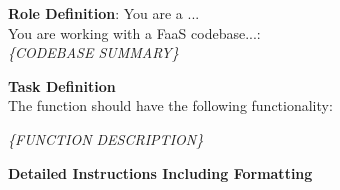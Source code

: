 \begin{tcolorbox}[colback=orange!5!white, colframe=orange!95!white, colbacktitle=orange!95!white, title=Zero Shot with Codebase Summarization]
\small
    \textbf{Role Definition}: You are a ...\\
    You are working with a FaaS codebase...:\\
    \textit{\{CODEBASE SUMMARY\}}

    \tcblower
\small
    \textbf{Task Definition}\\
    The function should have the following functionality:
    
    \textit{\{FUNCTION DESCRIPTION\}}
    
    \textbf{Detailed Instructions Including Formatting}
\normalsize
\end{tcolorbox}
\begin{minipage}{\linewidth}
\label{box:type2}
\end{minipage}